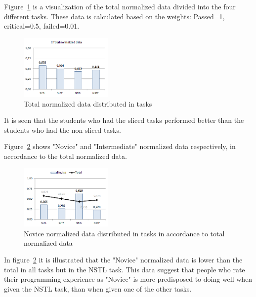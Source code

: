 \documentclass{sig-alternate-05-2015}
\begin{document}
Figure~\ref{fig:Total normalized data distributed in tasks} is a visualization of the total normalized data divided into the four different tasks. These data is calculated based on the weights: Passed=1, critical=0.5, failed=0.01.

\begin{figure}[H]
	\centering
	\includegraphics[width=0.4\textwidth]{img10}
	\caption{Total normalized data distributed in tasks}
	\label{fig:Total normalized data distributed in tasks}
\end{figure}

It is seen that the students who had the sliced tasks performed better than the students who had the non-sliced tasks.

Figure~\ref{fig:Novice normalized data distributed in tasks in accordance to total normalized data} shows "Novice" and "Intermediate" normalized data respectively, in accordance to the total normalized data.

\begin{figure}[H]
	\centering
	\includegraphics[width=0.4\textwidth]{img11}
	\caption{Novice normalized data distributed in tasks in accordance to total normalized data}
	\label{fig:Novice normalized data distributed in tasks in accordance to total normalized data}
\end{figure}

In figure~\ref{fig:Novice normalized data distributed in tasks in accordance to total normalized data} it is illustrated that the "Novice" normalized data is lower than the total in all tasks but in the NSTL task. This data suggest that people who rate their programming experience as "Novice" is more predisposed to doing well when given the NSTL task, than when given one of the other tasks.
\end{document}
